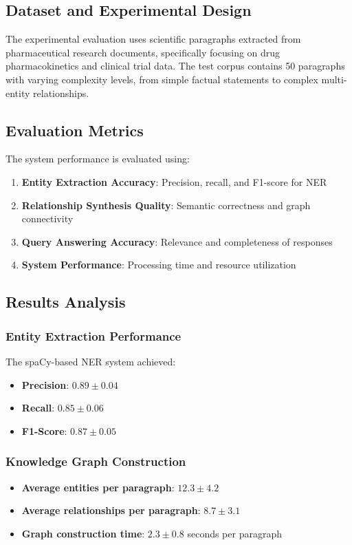 \documentclass[conference]{IEEEtran}
\begin{document}
\subsection{Dataset and Experimental Design}
The experimental evaluation uses scientific paragraphs extracted from pharmaceutical research documents, specifically focusing on drug pharmacokinetics and clinical trial data. The test corpus contains 50 paragraphs with varying complexity levels, from simple factual statements to complex multi-entity relationships.

\subsection{Evaluation Metrics}
The system performance is evaluated using:
\begin{enumerate}
\item \textbf{Entity Extraction Accuracy}: Precision, recall, and F1-score for NER
\item \textbf{Relationship Synthesis Quality}: Semantic correctness and graph connectivity
\item \textbf{Query Answering Accuracy}: Relevance and completeness of responses
\item \textbf{System Performance}: Processing time and resource utilization
\end{enumerate}

\subsection{Results Analysis}

\subsubsection{Entity Extraction Performance}
The spaCy-based NER system achieved:
\begin{itemize}
\item \textbf{Precision}: $0.89 \pm 0.04$
\item \textbf{Recall}: $0.85 \pm 0.06$
\item \textbf{F1-Score}: $0.87 \pm 0.05$
\end{itemize}

\subsubsection{Knowledge Graph Construction}
\begin{itemize}
\item \textbf{Average entities per paragraph}: $12.3 \pm 4.2$
\item \textbf{Average relationships per paragraph}: $8.7 \pm 3.1$
\item \textbf{Graph construction time}: $2.3 \pm 0.8$ seconds per paragraph
\end{itemize}
\end{document}
